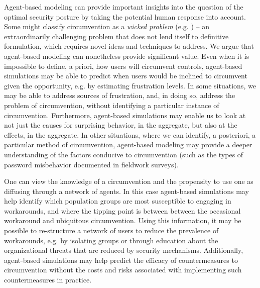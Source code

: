 \documentclass{acm_proc_article-sp}
\newcommand{\ignore}[1] {}
\begin{document}
Agent-based modeling can provide important insights into the question
of the optimal security posture by taking the potential human response
into account.  Some might classify circumvention as a \textit{wicked
  problem} (e.g. \cite{rittel1973dilemmas}) -- an extraordinarily
challenging problem that does not lend itself to definitive
formulation, which requires novel ideas and techniques to address.  We
argue that agent-based modeling can nonetheless provide significant
value.  Even when it is impossible to define, a priori, how users will
circumvent controls, agent-based simulations may be able to predict
when users would be inclined to circumvent given the opportunity,
e.g. by estimating frustration levels.  In some situations, we may be
able to address sources of frustration, and, in doing so, address the
problem of circumvention, without identifying a particular instance of
circumvention. Furthermore, agent-based simulations may enable us to
look at not just the causes for surprising behavior, in the aggregate,
but also at the effects, in the aggregate.  In other situations, where
we can identify, a posteriori, a particular method of circumvention,
agent-based modeling may provide a deeper understanding of the factors
conducive to circumvention (such as the types of password misbehavior
documented in fieldwork surveys).


One can view the knowledge of a circumvention and the propensity to
use one as diffusing through a network of agents. In this case
agent-based simulations may help identify which population groups are
most susceptible to engaging in workarounds, and where the tipping
point is between between the occasional workaround and ubiquitous
circumvention.  Using this information, it may be possible to
re-structure a network of users to reduce the prevalence of
workarounds, e.g. by isolating groups or through education about the
organizational threats that are reduced by security mechanisms.
Additionally, agent-based simulations may help predict the efficacy of
countermeasures to circumvention without the costs and risks
associated with implementing such countermeasures in practice.


\ignore{Agent models of human behavior might be an effective way to better
predict the impact of a security system in a given environment. These
models may predict otherwise unexpected outcomes due to individual
circumvention or emergent effects when a group of users collaborate
over a network.}
\end{document}
